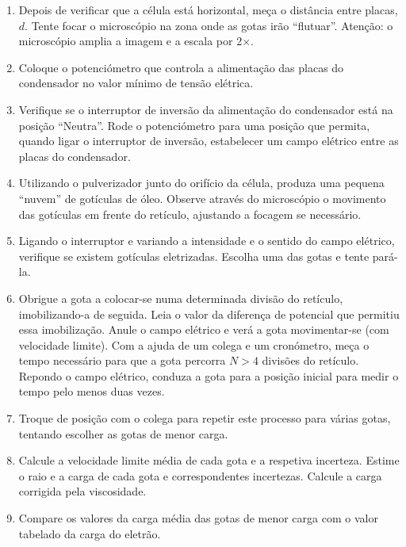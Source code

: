 \documentclass[a4paper,twoside,12pt]{article}      %
\begin{document}
\begin{enumerate}
\item   Depois de verificar que a célula está horizontal, meça o distância entre placas, $d$. Tente focar o microscópio na zona onde as gotas irão ``flutuar''. Atenção: o microscópio amplia a imagem e a escala por 2$\times$.

\item Coloque o potenciómetro que controla a alimentação das placas do condensador no valor mínimo de tensão elétrica. 

\item    Verifique se o interruptor de inversão da alimentação do condensador está na posição ``Neutra''.
Rode o potenciómetro para uma posição que permita, quando ligar o interruptor de inversão, estabelecer um campo elétrico entre as placas do condensador. 

\item     Utilizando o pulverizador junto do orifício da célula, produza uma pequena ``nuvem'' %
de gotículas de óleo. Observe através do microscópio o movimento das gotículas em 
frente do retículo, ajustando a focagem se necessário.

\item     Ligando o interruptor e variando a intensidade  e o  sentido do campo elétrico, verifique se existem gotículas eletrizadas. Escolha uma das gotas e tente pará-la.

 \item Obrigue a gota a colocar-se numa determinada divisão do retículo, imobilizando-a de seguida. 
Leia o valor da diferença de potencial que permitiu essa imobilização. Anule o 
campo elétrico  e verá a gota movimentar-se (com velocidade limite). Com a ajuda de um colega e um 
cronómetro, meça o tempo necessário para que a gota percorra  $N>4$ divisões
do retículo. Repondo o campo elétrico, conduza a gota para a posição inicial para  medir o tempo pelo menos duas vezes. 

\item Troque de posição com o colega para repetir este processo para várias gotas, tentando escolher as gotas de menor carga.

\item   Calcule a velocidade limite média de cada gota e a respetiva incerteza. Estime o raio e 
a carga de cada gota e correspondentes incertezas. Calcule a carga corrigida pela viscosidade.

\item   Compare os valores da carga média das gotas de menor carga  com o valor tabelado da carga do eletrão. 
\end{enumerate}



\end{document}
